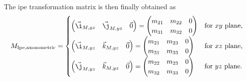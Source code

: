 \documentclass[11pt,a4paper]{article}
\begin{document}
The ipe transformation matrix is then finally obtained as
\begin{equation}
M_{\text{Ipe,axonometric}} =
\begin{cases}
\begin{pmatrix}
\vec{\i}_{M,yz} & \vec{\j}_{M,yz} & \vec{0}
\end{pmatrix}
=
\begin{pmatrix}
m_{21} & m_{22} & 0 \\
m_{31} & m_{32} & 0 \\
\end{pmatrix}
& \text{for $xy$ plane,} \\
\begin{pmatrix}
\vec{\i}_{M,yz} & \vec{k}_{M,yz} & \vec{0}
\end{pmatrix}
=
\begin{pmatrix}
m_{21} & m_{23} & 0 \\
m_{31} & m_{33} & 0 \\
\end{pmatrix}
& \text{for $xz$ plane,} \\
\begin{pmatrix}
\vec{\j}_{M,yz} & \vec{k}_{M,yz} & \vec{0}
\end{pmatrix}
=
\begin{pmatrix}
m_{22} & m_{23} & 0 \\
m_{32} & m_{33} & 0 \\
\end{pmatrix}
& \text{for $yz$ plane.} \\
\end{cases}
\end{equation}

%
%
%
\end{document}
